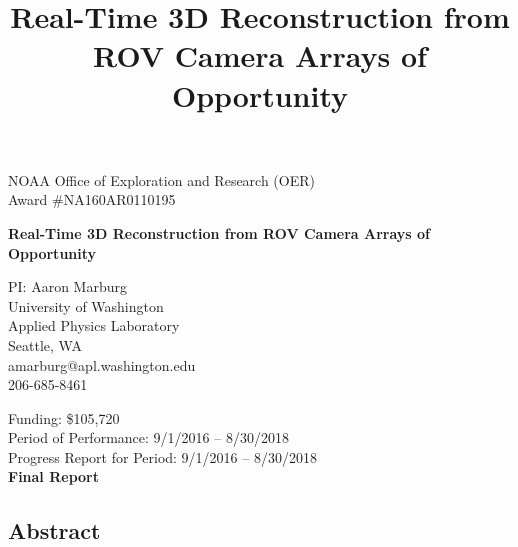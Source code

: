 \documentclass[letterpaper,12pt]{article}
\title{Real-Time 3D Reconstruction from ROV Camera Arrays of Opportunity}
\begin{document}
\begin{center} 
\thispagestyle{empty}

\vfill

{\large NOAA Office of Exploration and Research (OER)\\
Award \#NA160AR0110195}

\vspace{1em}

\textbf{\Large Real-Time 3D Reconstruction from ROV Camera Arrays of Opportunity}

\vfill

PI: Aaron Marburg \\
University of Washington  \\
Applied Physics Laboratory \\
Seattle, WA \\
amarburg@apl.washington.edu \\
206-685-8461

\vfill

Funding:  \$105,720 \\
Period of Performance:  9/1/2016 -- 8/30/2018\\
Progress Report for Period:   9/1/2016 -- 8/30/2018 \\
\textbf{Final Report}

\vfill 

%
\end{center} \clearpage
{}


\subsection*{Abstract} 
\end{document}
